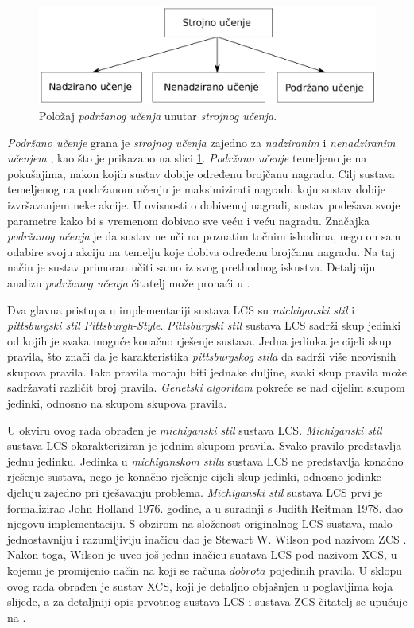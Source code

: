 \documentclass[times, utf8, zavrsni]{fer}
\begin{document}
\begin{figure}[!h]
    \centering
    \includegraphics[width=\textwidth]{img/ml.pdf}
    \caption{Položaj \emph{podržanog učenja} unutar \emph{strojnog učenja}.}
    \label{img:repol}
\end{figure}
\emph{Podržano učenje} grana je \emph{strojnog učenja}  zajedno za \emph{nadziranim}  i \emph{nenadziranim učenjem} , kao što je prikazano na slici \ref{img:repol}.
\emph{Podržano učenje} temeljeno je na pokušajima, nakon kojih sustav dobije određenu brojčanu nagradu.
Cilj sustava temeljenog na podržanom učenju je maksimizirati nagradu koju sustav dobije izvršavanjem neke akcije.
U ovisnosti o dobivenoj nagradi, sustav podešava svoje parametre kako bi s vremenom dobivao sve veću i veću nagradu.
Značajka \emph{podržanog učenja} je da sustav ne uči na poznatim točnim ishodima, nego on sam odabire svoju akciju na temelju koje dobiva određenu brojčanu nagradu.
Na taj način je sustav primoran učiti samo iz svog prethodnog iskustva.
Detaljniju analizu \emph{podržanog učenja} čitatelj može pronaći u \citep{7}.

Dva glavna pristupa u implementaciji sustava LCS su \emph{michiganski stil}  i \emph{pittsburgski stil} \emph{Pittsburgh-Style}.
\emph{Pittsburgski stil} sustava LCS sadrži skup jedinki od kojih je svaka moguće konačno rješenje sustava.
Jedna jedinka je cijeli skup pravila, što znači da je karakteristika \emph{pittsburgskog stila} da sadrži više neovisnih skupova pravila.
Iako pravila moraju biti jednake duljine, svaki skup pravila može sadržavati različit broj pravila.
\emph{Genetski algoritam} pokreće se nad cijelim skupom jedinki, odnosno na skupom skupova pravila.

U okviru ovog rada obrađen je \emph{michiganski stil} sustava LCS.
\emph{Michiganski stil} sustava LCS okarakteriziran je jednim skupom pravila.
Svako pravilo predstavlja jednu jedinku.
Jedinka u \emph{michiganskom stilu} sustava LCS ne predstavlja konačno rješenje sustava, nego je konačno rješenje cijeli skup jedinki, odnosno jedinke djeluju zajedno pri rješavanju problema.
\emph{Michiganski stil} sustava LCS prvi je formalizirao John Holland 1976. godine, a u suradnji s Judith Reitman 1978. dao njegovu implementaciju.
S obzirom na složenost originalnog LCS sustava, malo jednostavniju i razumljiviju inačicu dao je Stewart W. Wilson pod nazivom ZCS .
Nakon toga, Wilson je uveo još jednu inačicu suatava LCS pod nazivom XCS, u kojemu je promijenio način na koji se računa $dobrota$ pojedinih pravila.
U sklopu ovog rada obrađen je sustav XCS, koji je detaljno objašnjen u poglavljima koja slijede, a za detaljniji opis prvotnog sustava LCS i sustava ZCS čitatelj se upućuje na \citep{3}.
\end{document}
